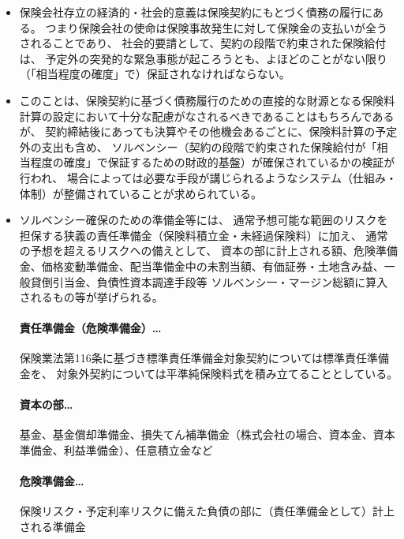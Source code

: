 \documentclass[report,gutter=10mm,fore-edge=10mm,uplatex,dvipdfmx]{jlreq}
\begin{document}
\begin{itemize}
\item
  保険会社存立の経済的・社会的意義は保険契約にもとづく債務の履行にある。
    つまり保険会社の使命は保険事故発生に対して保険金の支払いが全うされることであり、
    社会的要請として、契約の段階で約束された保険給付は、
    予定外の突発的な緊急事態が起ころうとも、よほどのことがない限り（「相当程度の確度」で）保証されなければならない。
\item
  このことは、保険契約に基づく債務履行のための直接的な財源となる保険料計算の設定において十分な配慮がなされるべきであることはもちろんであるが、
  契約締結後にあっても決算やその他機会あるごとに、保険料計算の予定外の支出も含め、
  ソルベンシー（契約の段階で約束された保険給付が「相当程度の確度」で保証するための財政的基盤）が確保されているかの検証が行われ、
  場合によっては必要な手段が講じられるようなシステム（仕組み・体制）が整備されていることが求められている。
\item
  ソルベンシー確保のための準備金等には、
    通常予想可能な範囲のリスクを担保する狭義の責任準備金（保険料積立金・未経過保険料）に加え、
  通常の予想を超えるリスクヘの備えとして、
    資本の部に計上される額、危険準備金、価格変動準備金、配当準備金中の未割当額、有価証券・土地含み益、一般貸倒引当金、負債性資本調達手段等
  ソルベンシ一・マージン総額に算入されるもの等が挙げられる。

   \paragraph{責任準備金（危険準備金）…} 

      保険業法第116条に基づき標準責任準備金対象契約については標準責任準備金を、
      対象外契約については平準純保険料式を積み立てることとしている。

  \paragraph{資本の部…} 

      基金、基金償却準備金、損失てん補準備金（株式会社の場合、資本金、資本準備金、利益準備金）、任意積立金など

  \paragraph{危険準備金…}

      保険リスク・予定利率リスクに備えた負債の部に（責任準備金として）計上される準備金

\end{itemize}
\end{document}
